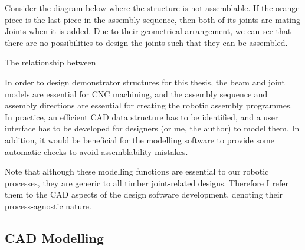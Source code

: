 Consider the diagram below where the structure is not assemblable. If the orange piece is the last piece in the assembly sequence, then both of its joints are mating Joints when it is added. Due to their geometrical arrangement, we can see that there are no possibilities to design the joints such that they can be assembled. 

The relationship between 

In order to design demonstrator structures for this thesis, the beam and joint models are essential for CNC machining, and the assembly sequence and assembly directions are essential for creating the robotic assembly programmes. In practice, an efficient CAD data structure has to be identified, and a user interface has to be developed for designers (or me, the author) to model them. In addition, it would be beneficial for the modelling software to provide some automatic checks to avoid assemblability mistakes. 

Note that although these modelling functions are essential to our robotic processes, they are generic to all timber joint-related designs. Therefore I refer them to the CAD aspects of the design software development, denoting their process-agnostic nature.

\subsection{CAD Modelling}
\label{subsection:exploration_2_cad_modelling}

